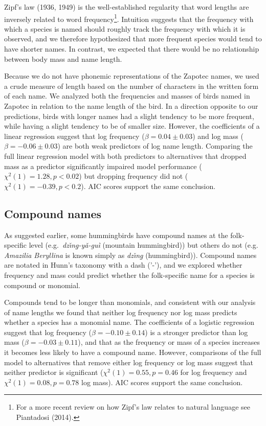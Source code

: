 \documentclass[10pt,letterpaper]{article}
\begin{document}
Zipf's law (1936, 1949)\nocite{zipf1936psycho,zipf1949human} is the well-established regularity that word lengths are  inversely related to word frequency\footnote{For a more recent review on how Zipf's law relates to natural language see Piantadosi (2014).\nocite{piantadosi2014zipf}}. Intuition suggests that the frequency with which a species is named should roughly track the frequency with which it is observed, and we therefore hypothesized that more frequent species would tend to have shorter names.  In contrast, we expected that there would be no relationship between body mass and name length. 

Because we do not have phonemic representations of the Zapotec names, we used a crude measure of length based on the number of characters in the written form of each name. We analyzed both the frequencies and masses of birds named in Zapotec in relation to the name length of the bird. In a direction opposite to our predictions, birds with longer names had a slight tendency to be more frequent, while having a slight tendency to be of smaller size. However, the coefficients of a linear regression suggest that log frequency ($\beta = 0.04 \pm 0.03$) and log mass ($\beta = -0.06 \pm 0.03$) are both weak predictors of log name length. Comparing the full linear regression model with both predictors to alternatives that dropped mass as a predictor significantly impaired model performance ($\chi^{2}(1) = 1.28, p < 0.02$) but dropping frequency did not ($\chi^{2}(1) = -0.39, p < 0.2$). AIC scores support the same conclusion.


\subsection{Compound names}

As suggested earlier, some hummingbirds have compound names at the folk-specific level (e.g.\ \textit{dz\v{\i}n\b{g}-y\v{a}-gu\`{i}} (mountain hummingbird)) but others do not (e.g.\   
\emph{ Amazilia Beryllina} is known simply as \textit{dz\v{\i}n\b{g}} (hummingbird)). Compound names are notated in Hunn's taxonomy with a dash ('-'), and we explored whether frequency and mass could predict whether the folk-specific name for a species is compound or monomial. 


Compounds tend to be longer than monomials, and consistent with our analysis of name lengths we found 
that neither log frequency nor log mass predicts whether a species has a monomial name. The coefficients of a logistic regression suggest that log frequency ($\beta = -0.10 \pm 0.14$) is a stronger predictor than log mass ($\beta = -0.03 \pm 0.11$), and that as the frequency or mass of a species increases it becomes less likely to have a compound name. However, comparisons of the full model to alternatives that remove either log frequency or log mass  suggest that neither predictor is significant ($\chi^{2}(1) = 0.55, p = 0.46$ for log frequency and $\chi^{2}(1) = 0.08, p = 0.78$ log mass).  AIC scores support the same conclusion. 
\end{document}
